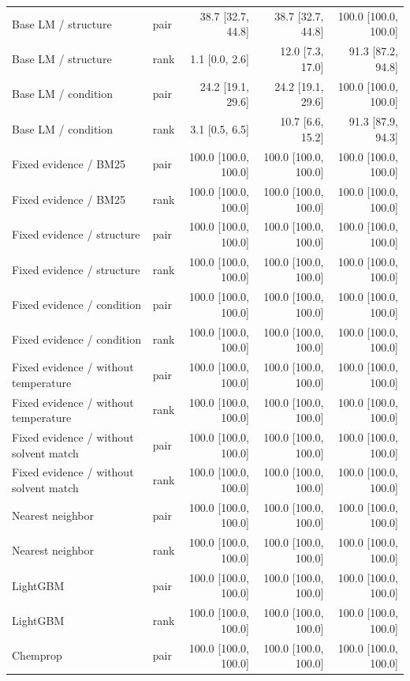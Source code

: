 \begin{longtable}{p{.26\linewidth}lrrr}
Base LM / structure & pair & 38.7 [32.7, 44.8] & 38.7 [32.7, 44.8] & 100.0 [100.0, 100.0] \\
Base LM / structure & rank & 1.1 [0.0, 2.6] & 12.0 [7.3, 17.0] & 91.3 [87.2, 94.8] \\
Base LM / condition & pair & 24.2 [19.1, 29.6] & 24.2 [19.1, 29.6] & 100.0 [100.0, 100.0] \\
Base LM / condition & rank & 3.1 [0.5, 6.5] & 10.7 [6.6, 15.2] & 91.3 [87.9, 94.3] \\
Fixed evidence / BM25 & pair & 100.0 [100.0, 100.0] & 100.0 [100.0, 100.0] & 100.0 [100.0, 100.0] \\
Fixed evidence / BM25 & rank & 100.0 [100.0, 100.0] & 100.0 [100.0, 100.0] & 100.0 [100.0, 100.0] \\
Fixed evidence / structure & pair & 100.0 [100.0, 100.0] & 100.0 [100.0, 100.0] & 100.0 [100.0, 100.0] \\
Fixed evidence / structure & rank & 100.0 [100.0, 100.0] & 100.0 [100.0, 100.0] & 100.0 [100.0, 100.0] \\
Fixed evidence / condition & pair & 100.0 [100.0, 100.0] & 100.0 [100.0, 100.0] & 100.0 [100.0, 100.0] \\
Fixed evidence / condition & rank & 100.0 [100.0, 100.0] & 100.0 [100.0, 100.0] & 100.0 [100.0, 100.0] \\
Fixed evidence / without temperature & pair & 100.0 [100.0, 100.0] & 100.0 [100.0, 100.0] & 100.0 [100.0, 100.0] \\
Fixed evidence / without temperature & rank & 100.0 [100.0, 100.0] & 100.0 [100.0, 100.0] & 100.0 [100.0, 100.0] \\
Fixed evidence / without solvent match & pair & 100.0 [100.0, 100.0] & 100.0 [100.0, 100.0] & 100.0 [100.0, 100.0] \\
Fixed evidence / without solvent match & rank & 100.0 [100.0, 100.0] & 100.0 [100.0, 100.0] & 100.0 [100.0, 100.0] \\
Nearest neighbor & pair & 100.0 [100.0, 100.0] & 100.0 [100.0, 100.0] & 100.0 [100.0, 100.0] \\
Nearest neighbor & rank & 100.0 [100.0, 100.0] & 100.0 [100.0, 100.0] & 100.0 [100.0, 100.0] \\
LightGBM & pair & 100.0 [100.0, 100.0] & 100.0 [100.0, 100.0] & 100.0 [100.0, 100.0] \\
LightGBM & rank & 100.0 [100.0, 100.0] & 100.0 [100.0, 100.0] & 100.0 [100.0, 100.0] \\
Chemprop & pair & 100.0 [100.0, 100.0] & 100.0 [100.0, 100.0] & 100.0 [100.0, 100.0] \\

\end{longtable}
